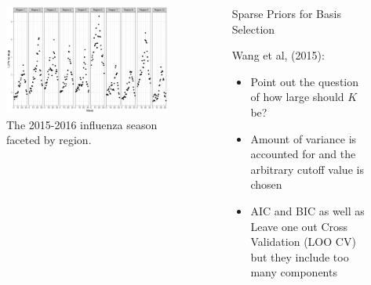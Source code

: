 \documentclass[final]{beamer}
\newlength{\sepwid}
\newlength{\onecolwid}
\newlength{\twocolwid}
\begin{document}
\begin{frame}[t]
\begin{columns}[t]
\begin{column}{\onecolwid}
\begin{figure}
\includegraphics[width=\linewidth]{plots/ILI.png}
\caption{The 2015-2016 influenza season faceted by region.}
\end{figure}


\end{column} %

\begin{column}{\sepwid}\end{column} %

\begin{column}{\twocolwid} %

\begin{columns}[t,totalwidth=\twocolwid] %

\begin{column}{\onecolwid}\vspace{-.6in} %


\begin{block}{Sparse Priors for Basis Selection}

Wang et al, (2015):
\begin{itemize}
\item Point out the question of how large should $K$ be?
\item Amount of variance is accounted for and the arbitrary cutoff value is chosen
\item AIC and BIC as well as Leave one out Cross Validation (LOO CV) but they include too many components \\
\end{itemize}


\end{block}
\end{column}
\end{columns}
\end{column}
\end{columns}
\end{frame}
\end{document}
